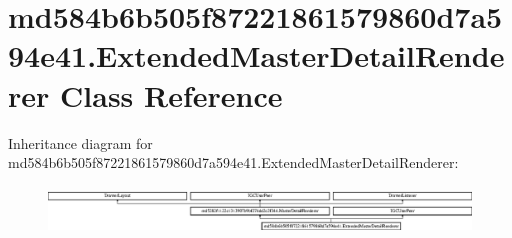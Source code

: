 \hypertarget{classmd584b6b505f87221861579860d7a594e41_1_1ExtendedMasterDetailRenderer}{}\section{md584b6b505f87221861579860d7a594e41.\+Extended\+Master\+Detail\+Renderer Class Reference}
\label{classmd584b6b505f87221861579860d7a594e41_1_1ExtendedMasterDetailRenderer}
Inheritance diagram for md584b6b505f87221861579860d7a594e41.\+Extended\+Master\+Detail\+Renderer\+:\begin{figure}[H]
\begin{center}
\leavevmode
\includegraphics[height=1.261261cm]{classmd584b6b505f87221861579860d7a594e41_1_1ExtendedMasterDetailRenderer}
\end{center}
\end{figure}
